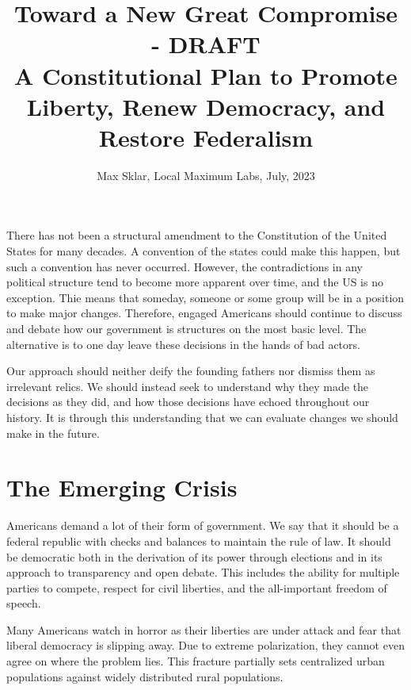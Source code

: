 \documentclass{article}
\begin{document}
\parindent=0in
\parskip=12pt

\title{
  Toward a New Great Compromise - DRAFT \\
  \large{
    A Constitutional Plan to Promote Liberty, Renew Democracy, and Restore Federalism
  }
}

\author{Max Sklar, Local Maximum Labs, July, 2023}
\date{}

\maketitle
\thispagestyle{empty}

There has not been a structural amendment to the Constitution of the United States for many decades. A convention of the states could make this happen, but such a convention has never occurred. However, the contradictions in any political structure tend to become more apparent over time, and the US is no exception. Thie means that someday, someone or some group will be in a position to make major changes. Therefore, engaged Americans should continue to discuss and debate how our government is structures on the most basic level. The alternative is to one day leave these decisions in the hands of bad actors.

Our approach should neither deify the founding fathers nor dismiss them as irrelevant relics. We should instead seek to understand why they made the decisions as they did, and how those decisions have echoed throughout our history. It is through this understanding that we can evaluate changes we should make in the future.

\section{The Emerging Crisis}

Americans demand a lot of their form of government. We say that it should be a federal republic with checks and balances to maintain the rule of law. It should be democratic both in the derivation of its power through elections and in its approach to transparency and open debate. This includes the ability for multiple parties to compete, respect for civil liberties, and the all-important freedom of speech.

Many Americans watch in horror as their liberties are under attack and fear that liberal democracy is slipping away. Due to extreme polarization, they cannot even agree on where the problem lies. This fracture partially sets centralized urban populations against widely distributed rural populations. 
\end{document}

